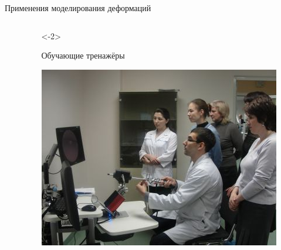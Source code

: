 \documentclass[usenames,dvipsnames,pdftex,unicode,hidelinks]{beamer}
\begin{document}
\begin{frame}{Применения моделирования деформаций}
\begin{columns}[c]
\begin{column}{0.5\textwidth}
\begin{center}
        \end{center}
      \end{column}
      \begin{column}{0.5\textwidth}<-2>
        \begin{center}
          Обучающие тренажёры

          \includegraphics[height=0.3\textheight]{trainer}


\end{center}
\end{column}
\end{columns}
\end{frame}
\end{document}
